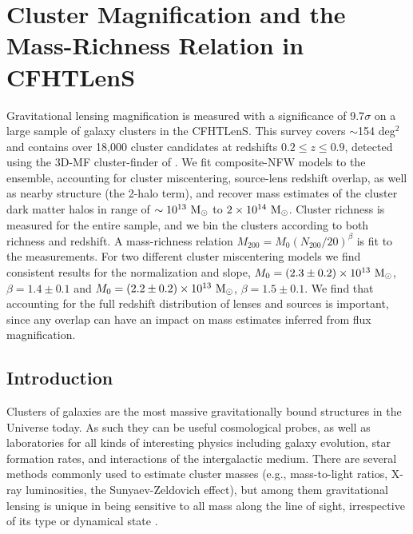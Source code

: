 
\chapter{Cluster Magnification and the Mass-Richness Relation in CFHTLenS}
\label{ch3}

Gravitational lensing magnification is measured with a significance of 9.7$\sigma$ on a large sample of galaxy clusters in the \acf{CFHTLenS}. This survey covers $\sim$154 deg$^2$ and contains over 18,000 cluster candidates at redshifts $0.2 \leq z \leq 0.9$, detected using the \acf{3D-MF} cluster-finder of \citet{Milkeraitis10}. We fit composite-\ac{NFW} models to the ensemble, accounting for cluster miscentering, source-lens redshift overlap, as well as nearby structure (the 2-halo term), and recover mass estimates of the cluster dark matter halos in range of $\sim10^{13}\ {\rm M}_\odot$ to $2\times10^{14}\ {\rm M}_\odot$. Cluster richness is measured for the entire sample, and we bin the clusters according to both richness and redshift. A mass-richness relation $M_{200} = M_0 (N_{200} / 20)^\beta$ is fit to the measurements. For two different cluster miscentering models we find consistent results for the normalization and slope,  $M_0 = (2.3 \pm 0.2) \times 10^{13}\ {\rm M}_\odot$, $\beta = 1.4 \pm 0.1$ and $M_0 = (2.2 \pm 0.2) \times 10^{13}\ {\rm M}_\odot$, $\beta = 1.5 \pm 0.1$. We find that accounting for the full redshift distribution of lenses and sources is important, since any overlap can have an impact on mass estimates inferred from flux magnification.


\section{Introduction}
Clusters of galaxies are the most massive gravitationally bound structures in the Universe today. As such they can be useful cosmological probes, as well as laboratories for all kinds of interesting physics including galaxy evolution, star formation rates, and interactions of the intergalactic medium. There are several methods commonly used to estimate cluster masses (e.g., mass-to-light ratios, X-ray luminosities, the Sunyaev-Zeldovich effect), but among them gravitational lensing is unique in being sensitive to all mass along the line of sight, irrespective of its type or dynamical state \citep{BS01}.

